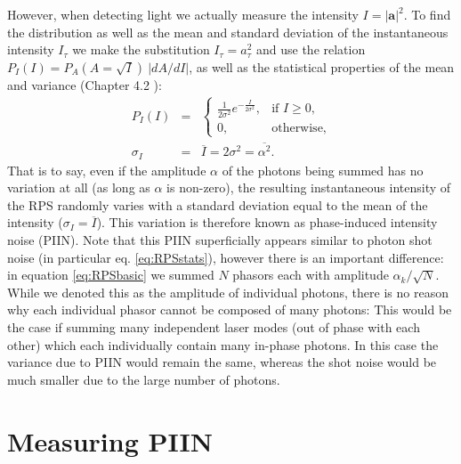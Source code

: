 \documentclass[]{article}
\newcommand*\mean[1]{\overline{#1}}
\begin{document}
    However, when detecting light we actually measure the intensity $I = |\mathbf{a}|^2$. To find the distribution as well as the mean and standard deviation of the instantaneous intensity $I_\tau$ we make the substitution $I_\tau = a_\tau ^2$ and use the relation $P_I(I)=P_A(A=\sqrt{I})\>|dA/dI|$, as well as the statistical properties of the mean and variance (Chapter 4.2 \cite{goodman_statistical_2000}):
    	\begin{eqnarray}
    		P_I(I)&=&
		\begin{cases}
			\frac{1}{2\sigma^2} e^{-\frac{I}{2 \sigma ^2}},& \text{if } I \geq 0,\\
		    0,              & \text{otherwise,}
		\end{cases}
		\\
			\sigma_I &=& \mean{I} = 2\sigma^2 = \mean{\alpha^2}. \label{eq:RPSstats}
		\end{eqnarray}
	That is to say, even if the amplitude $\alpha$ of the photons being summed has no variation at all (as long as $\alpha$ is non-zero), the resulting instantaneous intensity of the RPS randomly varies with a standard deviation equal to the mean of the intensity ($\sigma_I = \mean{I}$). This variation is therefore known as phase-induced intensity noise (PIIN). Note that this PIIN superficially appears similar to photon shot noise (in particular eq. \ref{eq:RPSstats}), however there is an important difference: in equation \ref{eq:RPSbasic} we summed $N$ phasors each with amplitude $\alpha_k /\sqrt{N}$. While we denoted this as the amplitude of individual photons, there is no reason why each individual phasor cannot be composed of many photons: This would be the case if summing many independent laser modes (out of phase with each other) which each individually contain many in-phase photons. In this case the variance due to PIIN would remain the same, whereas the shot noise would be much smaller due to the large number of photons.

\section{Measuring PIIN}
	
\end{document}
